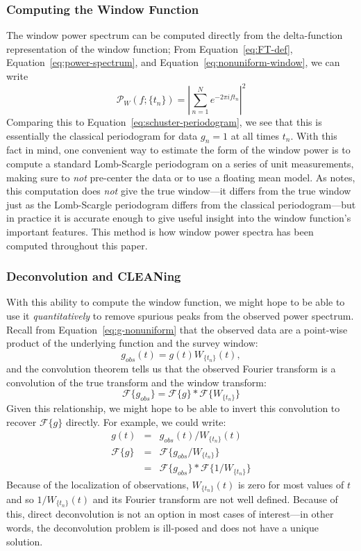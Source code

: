 \documentclass[preprint]{aastex}
\newcommand{\Eq}[1]{Equation~\ref{eq:#1}}
\newcommand{\eq}[1]{\Eq{#1}}
\newcommand{\eqlabel}[1]{\label{eq:#1}}
\newcommand{\sectlabel}[1]{\label{sect:#1}}
\begin{document}
\subsubsection{Computing the Window Function}
\sectlabel{computing-window-function}
The window power spectrum can be computed directly from the
delta-function representation of the window function;
From \eq{FT-def}, \eq{power-spectrum}, and \eq{nonuniform-window},
we can write
\begin{equation}
  \mathcal{P}_W(f;\{t_n\}) = \left|\sum_{n=1}^{N} e^{-2\pi i f t_n}\right|^2
  \eqlabel{window-power-analytic}
\end{equation}
Comparing this to \eq{schuster-periodogram}, we see that this is essentially
the classical periodogram for data $g_n=1$ at all times $t_n$.
With this fact in mind, one convenient way to estimate the form of the
window power is to compute a standard Lomb-Scargle periodogram on a series of
unit measurements, making sure to {\it not} pre-center the data or to use a
floating mean model.
As \citet{Scargle82} notes, this computation does {\it not} give the true
window---it differs
from the true window just as the Lomb-Scargle periodogram differs from the
classical periodogram---but in practice it is accurate enough to give
useful insight into the window function's important features.
This method is how window power spectra has been computed throughout this
paper.

\subsubsection{Deconvolution and CLEANing}
\sectlabel{CLEAN}
With this ability to compute the window function, we might hope to be able to
use it {\it quantitatively} to remove spurious peaks from the observed
power spectrum.
Recall from \eq{g-nonuniform} that the observed data are a point-wise product
of the underlying function and the survey window:
\begin{equation}
  g_{obs}(t) = g(t)W_{\{t_n\}}(t),
\end{equation}
and the convolution theorem tells us that the observed Fourier transform is
a convolution of the true transform and the window transform:
\begin{equation}
  \mathcal{F}\{g_{obs}\} = \mathcal{F}\{g\} \ast \mathcal{F}\{W_{\{t_n\}}\}
\end{equation}
Given this relationship, we might hope to be able to invert this
convolution to recover $\mathcal{F}\{g\}$ directly.
For example, we could write:
\begin{eqnarray}
  g(t) &=& g_{obs}(t) / W_{\{t_n\}}(t)\nonumber\\
  \mathcal{F}\{g\} &=& \mathcal{F}\{g_{obs}/W_{\{t_n\}}\}\nonumber\\
                   &=& \mathcal{F}\{g_{obs}\} \ast \mathcal{F}\{1/W_{\{t_n\}}\}
\end{eqnarray}
Because of the localization of observations, $W_{\{t_n\}}(t)$ is zero for most
values of $t$ and so $1/W_{\{t_n\}}(t)$ and its Fourier transform are not well
defined. Because of this, direct deconvolution is not an option in most
cases of interest---in other words, the deconvolution problem is ill-posed
and does not have a unique solution.
\end{document}
